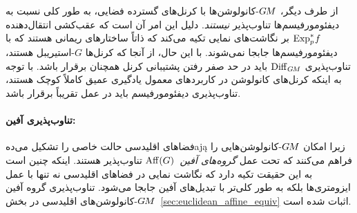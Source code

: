 از طرف دیگر، $G\mkern-1.4muM$-کانولوشن‌ها با کرنل‌های گسترده فضایی، به طور کلی نسبت به دیفئومورفیسم‌ها تناوب‌پذیر \emph{نیستند}.
دلیل این امر آن است که عقب‌کشی انتقال‌دهنده $\operatorname{Exp}^*_p\mkern-2mu f$ بر نگاشت‌های نمایی تکیه می‌کند که ذاتاً ساختارهای ریمانی هستند که با دیفئومورفیسم‌ها جابجا نمی‌شوند.
با این حال، از آنجا که کرنل‌ها $G$-استیریبل هستند، تناوب‌پذیری $\operatorname{Diff}_{G\mkern-1.4muM}$ باید در حد صفر رفتن پشتیبانی کرنل همچنان برقرار باشد.
با توجه به اینکه کرنل‌های کانولوشن در کاربردهای معمول یادگیری عمیق کاملاً کوچک هستند، تناوب‌پذیری دیفئومورفیسم باید در عمل تقریباً برقرار باشد.



\paragraph{تناوب‌پذیری آفین:}
فضاهای اقلیدسی حالت خاصی را تشکیل می‌دهają زیرا امکان $G\mkern-1.4muM$-کانولوشن‌هایی را فراهم می‌کنند که تحت عمل \emph{گروه‌های آفین}~$\operatorname{Aff}(G)$ تناوب‌پذیر هستند.
اینکه چنین است به این حقیقت تکیه دارد که نگاشت نمایی در فضاهای اقلیدسی نه تنها با عمل ایزومتری‌ها بلکه به طور کلی‌تر با تبدیل‌های آفین جابجا می‌شود.
تناوب‌پذیری گروه آفین $G\mkern-1.4muM$-کانولوشن‌های اقلیدسی در بخش~\ref{sec:euclidean_affine_equiv} اثبات شده است.